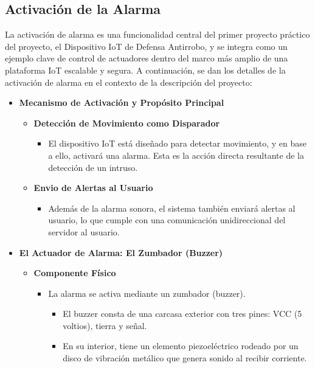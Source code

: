 \documentclass{report}
\begin{document}
\subsection{Activación de la Alarma}
La activación de alarma es una funcionalidad central del primer proyecto práctico del proyecto, el Dispositivo IoT de Defensa Antirrobo, y se integra como un 
ejemplo clave de control de actuadores dentro del marco más amplio de una plataforma IoT escalable y segura.
A continuación, se dan los detalles de la activación de alarma en el contexto de la descripción del proyecto:
\begin{itemize}
    \item \textbf{Mecanismo de Activación y Propósito Principal}
    \begin{itemize}
        \item \textbf{Detección de Movimiento como Disparador}
        \begin{itemize}
            \item El dispositivo IoT está diseñado para detectar movimiento, y en base a ello, activará una alarma. Esta es la acción 
            directa resultante de la detección de un intruso.
        \end{itemize}

        \item \textbf{Envio de Alertas al Usuario}
        \begin{itemize}
            \item Además de la alarma sonora, el sistema también enviará alertas al usuario, lo que cumple con una comunicación unidireccional del servidor al 
            usuario.
        \end{itemize}
    \end{itemize}

    \item \textbf{El Actuador de Alarma: El Zumbador (Buzzer)}
    \begin{itemize}
        \item \textbf{Componente Físico}
        \begin{itemize}
            \item La alarma se activa mediante un zumbador (buzzer).
            \begin{itemize}
                \item El buzzer consta de una carcasa exterior con tres pines: VCC (5 voltios), tierra y señal.
                \item En su interior, tiene un elemento piezoeléctrico rodeado por un disco de vibración metálico que genera sonido al recibir corriente.
            \end{itemize}
        \end{itemize}


\end{itemize}
\end{itemize}
\end{document}
